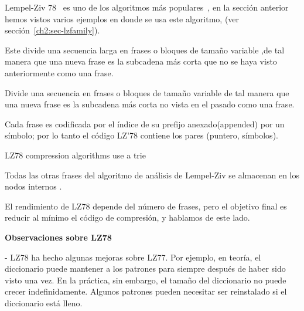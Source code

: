 









Lempel-Ziv 78~\cite{ZivLempel1978} es uno de los algoritmos \losslessdatacompression más populares~\cite{Begleiter2004}, en la sección anterior hemos vistos varios ejemplos en donde se usa este algoritmo, (ver sección~\ref{ch2:sec-lzfamily}).

Este divide una secuencia larga en frases o bloques de tamaño variable ,de tal manera que una nueva frase es la subcadena más corta que no se haya visto anteriormente como una frase.

Divide una secuencia en frases o bloques de tamaño variable de tal manera que una nueva frase es la subcadena más corta no vista en el pasado como una frase.

Cada frase es codificada por el índice de su prefijo anexado(appended) por un símbolo; por lo tanto el código LZ'78 contiene los pares (puntero, símbolos).

LZ78 compression algorithms use a trie


Todas las otras frases del algoritmo de análisis de Lempel-Ziv se almacenan en los nodos internos .



El rendimiento de LZ78 depende del número de frases, pero el objetivo final es reducir al mínimo el código de compresión, y hablamos de este lado.








\textbf{Observaciones sobre LZ78}


- LZ78 ha hecho algunas mejoras sobre LZ77. 
Por ejemplo, en teoría, el diccionario puede mantener a los 
patrones para siempre después de haber sido visto una vez. 
En la práctica, sin embargo, el tamaño del diccionario 
no puede crecer indefinidamente. 
Algunos patrones pueden necesitar ser reinstalado si el diccionario está lleno.

